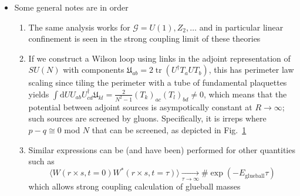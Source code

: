 \begin{itemize}
This leads to very demanding calculations but in the end the results are similar

\begin{equation}
\sigma=\ln \frac{\beta}{18}+4\left(\frac{\beta}{18}\right)^{4}+12\left(\frac{\beta}{18}\right)^{5}+\ldots
\end{equation}
\begin{figure}
    \centering
    \caption{A depiction of screening, showing a tube of fundamental plaquettes along the perimeter of the large loop.}
    \label{fig:screen}
\end{figure}
\item Some general notes are in order
\begin{enumerate}
    \item The same analysis works for $\mathcal{G} = U(1), Z_2, \ldots$ and in particular linear confinement is seen in the strong coupling limit of these theories
    \item If we construct a Wilson loop using links in the adjoint representation of $SU(N)$ with components $\mathfrak{U}_{ab} = 2 \operatorname{tr}(U^\dagger T_a U T_b)$, this has perimeter law scaling since tiling the perimeter with a tube of fundamental plaquettes yields $\int \text{d} U U_{ab}U^\dagger_{cd}\mathfrak{U}_{kl} = \frac{2}{N^2 - 1}(T_k)_{ac}(T_l)_{bd} \neq 0$, which means that the potential between adjoint sources is asympotically constant at $R \to \infty$; such sources are screened by gluons. Specifically, it is irreps where $p - q \cong 0$ mod $N$ that can be screened, as depicted in Fig.~\ref{fig:screen}
    
    \item Similar expressions can be (and have been) performed for other quantities such as 
    \begin{equation}
    \langle W(r \times s, t=0) W^*(r \times s, t = \tau)\rangle \underset{\tau \to \infty}{\to} \# \exp(-E_{\text{glueball}} \tau)
    \end{equation}
    which allows strong coupling calculation of glueball masses
    

\end{enumerate}
\end{itemize}
